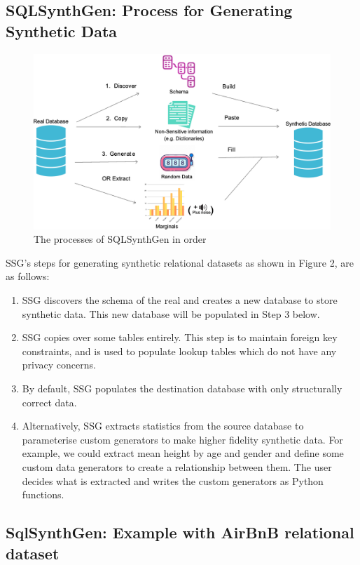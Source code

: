 \documentclass[11pt]{article}
\begin{document}
\subsection{SQLSynthGen: Process for Generating Synthetic Data}

\begin{figure}[ht]
\centering
\includegraphics[width=0.8\linewidth]{figures/SSG.png}
\caption{The processes of SQLSynthGen in order}
\label{fig:Range of fidelity for synthetic data}
\end{figure}

SSG's steps for generating synthetic relational datasets as shown in Figure 2, are as follows:

\begin{enumerate}
    \item SSG discovers the schema of the real and creates a new database to store synthetic data. This new database will be populated in Step 3 below. 
    \item SSG copies over some tables entirely. This step is to maintain foreign key constraints, and is used to populate lookup tables which do not have any privacy concerns.
    \item By default, SSG populates the destination database with only structurally correct data. \item Alternatively, SSG extracts statistics from the source database to parameterise custom generators to make higher fidelity synthetic data. For example, we could extract mean height by age and gender and define some custom data generators to create a relationship between them. The user decides what is extracted and writes the custom generators as Python functions.
\end{enumerate}

\subsection{SqlSynthGen: Example with AirBnB relational dataset}
\end{document}
